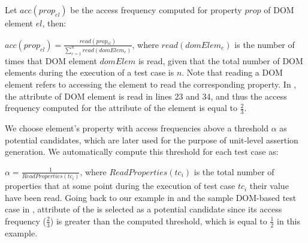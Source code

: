 Let $acc(prop_{el})$ be the access frequency computed for property $prop$ of DOM element $el$, then:
 
$acc(prop_{el})=\frac{read(prop_{el})}{\sum _{e=1}^{n} read(domElem_e)}$, where $read(domElem_{e})$ is the number of times that DOM element $domElem$ is read, given that the total number of DOM elements during the execution of a test case is $n$.
Note that reading a DOM element refers to accessing the element to read the corresponding property. In , the  attribute of DOM element  is read in lines 23 and 34, and thus the access frequency
computed for the  attribute of the element is equal to $\frac{2}{3}$.

We choose element's property with access frequencies above a threshold $\alpha$ as potential candidates, which are later used for the purpose of unit-level assertion generation. We automatically compute this threshold for each test case as: 

$\alpha=\frac{1}{ReadProperties(tc_i)}$, where $ReadProperties(tc_i)$ is the total number of properties that at some point during the execution of test case $tc_i$ their value have been read.
Going back to our example in  and the sample DOM-based test case in ,  attribute of the  is selected as a potential candidate since its access frequency ($\frac{2}{3}$) is greater than the computed threshold, which is equal to $\frac{1}{2}$ in this example.        
